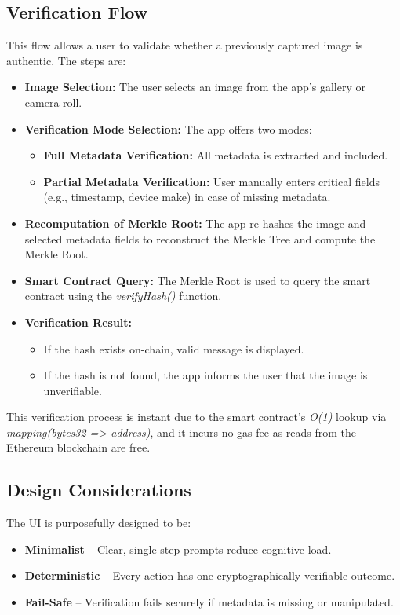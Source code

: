 \subsection{Verification Flow}
This flow allows a user to validate whether a previously captured image is authentic. The steps are:
\begin{itemize}
    \item {\textbf{Image Selection:}} The user selects an image from the app's gallery or camera roll.
    \item {\textbf{Verification Mode Selection:}} The app offers two modes:
        \begin{itemize}
            \item {\textbf{Full Metadata Verification:}} All metadata is extracted and included.
            \item {\textbf{Partial Metadata Verification:}} User manually enters critical fields (e.g., timestamp, device make) in case of missing metadata.
        \end{itemize}
    
    \item {\textbf{Recomputation of Merkle Root: }} The app re-hashes the image and selected metadata fields to reconstruct the Merkle Tree and compute the Merkle Root.
    \item {\textbf{Smart Contract Query:}} The Merkle Root is used to query the smart contract using the \textit{verifyHash()} function.
    \item {\textbf{Verification Result:}}
        \begin{itemize}
            \item If the hash exists on-chain, valid message is displayed.
            \item If the hash is not found, the app informs the user that the image is unverifiable.
        \end{itemize}
\end{itemize}


This verification process is instant due to the smart contract’s \textit{O(1)} lookup via \textit{mapping(bytes32 => address)}, and it incurs no gas fee as reads from the Ethereum blockchain are free.

\subsection{Design Considerations}
The UI is purposefully designed to be:

\begin{itemize}
    \item {\textbf{Minimalist}} – Clear, single-step prompts reduce cognitive load.
    \item {\textbf{Deterministic}} – Every action has one cryptographically verifiable outcome.
    \item {\textbf{Fail-Safe}} – Verification fails securely if metadata is missing or manipulated.
\end{itemize}

